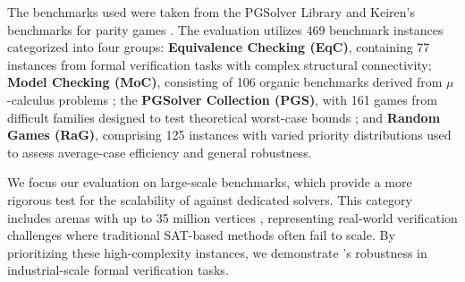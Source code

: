 \documentclass[a4paper,UKenglish,cleveref, autoref, thm-restate, anonymous]{lipics-v2021}
\begin{document}
The benchmarks used were taken from the PGSolver Library \cite{Friedmann:2017} and Keiren's benchmarks for parity games \cite{Keiren:2015}. The evaluation utilizes 469 benchmark instances categorized into four groups: \textbf{Equivalence Checking (EqC)}, containing 77 instances from formal verification tasks with complex structural connectivity; \textbf{Model Checking (MoC)}, consisting of 106 organic benchmarks derived from $\mu$-calculus problems ; the \textbf{PGSolver Collection (PGS)}, with 161 games from difficult families designed to test theoretical worst-case bounds ; and \textbf{Random Games (RaG)}, comprising 125 instances with varied priority distributions used to assess average-case efficiency and general robustness.





We focus our evaluation on large-scale benchmarks, which provide a more rigorous test for the scalability of \nocq against dedicated solvers. This category includes arenas with up to 35 million vertices , representing real-world verification challenges where traditional SAT-based methods often fail to scale. By prioritizing these high-complexity instances, we demonstrate \nocq's robustness in industrial-scale formal verification tasks.
\end{document}
